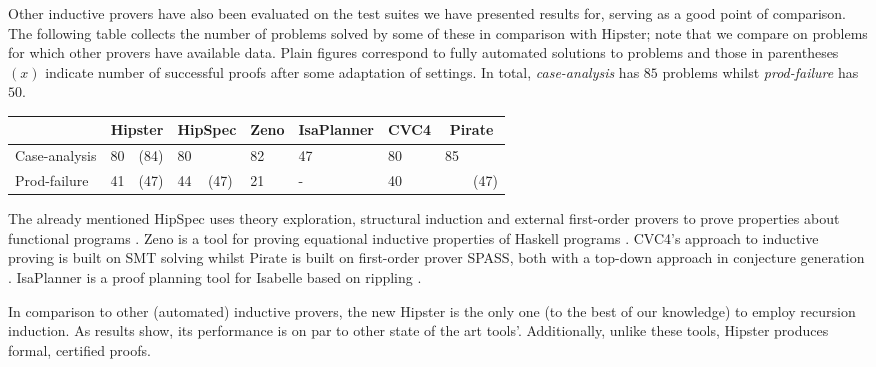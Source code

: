 
Other inductive provers have also been evaluated on the test suites we have presented results for, serving as a good point of comparison.
%
The following table collects the number of problems solved by some of these in comparison with Hipster; note that we compare on problems for which other provers have available data.
%
Plain figures correspond to fully automated solutions to problems and those in parentheses $(x)$ indicate number of successful proofs after some adaptation of settings.
%
In total, \emph{case-analysis} has $85$ problems whilst \emph{prod-failure} has $50$.
%

\vspace{2 mm}

\noindent \begin{tabularx}{\textwidth}{l | X X | X X | X | X | X | X X}
  & \multicolumn{2}{|c|}{Hipster}
  	& \multicolumn{2}{c|}{HipSpec}
  	& \multicolumn{1}{c|}{Zeno}
  	& \multicolumn{1}{c|}{IsaPlanner}
  	& \multicolumn{1}{c|}{CVC4}
  	& \multicolumn{2}{c}{Pirate} \\
  \hline
  Case-analysis & 80 & (84) & 80 & & 82 & 47 & 80 & 85 & \\
  Prod-failure & 41 & (47) & 44 & (47) & 21 & - & 40 & & (47) \\
\end{tabularx}

\vspace{2 mm}

\noindent The already mentioned HipSpec uses theory exploration, structural induction and external first-order provers to prove properties about functional programs \cite{hipspecCADE}.
%
Zeno is a tool for proving equational inductive properties of Haskell programs \cite{zeno}.
%
CVC4's approach to inductive proving is built on SMT solving whilst Pirate is built on first-order prover SPASS, both with a top-down approach in conjecture generation \cite{cvc4, SPASSInduction}.
%
IsaPlanner is a proof planning tool for Isabelle based on rippling \cite{isaplanner2, IsaPcase}.

In comparison to other (automated) inductive provers, the new Hipster is the only one (to the best of our knowledge) to employ recursion induction.
%
As results show, its performance is on par to other state of the art tools'.
%
Additionally, unlike these tools, Hipster produces formal, certified proofs.

